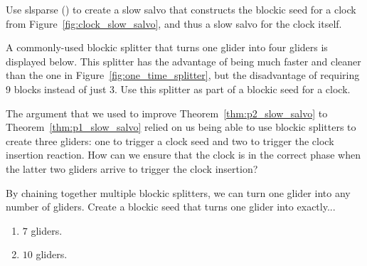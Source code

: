 \begin{multicols}{2}
	
	\mfilbreak
	
	
	\begin{problem}\label{exer:create_clock_turners_nonsync} 
		Use slsparse () to create a slow salvo that constructs the blockic seed for a clock from Figure~\ref{fig:clock_slow_salvo}, and thus a slow salvo for the clock itself.
	\end{problem}
	
	
	\mfilbreak
	
	
	\begin{problem}\label{exer:new_splitter} 
		A commonly-used blockic splitter that turns one glider into four gliders is displayed below. This splitter has the advantage of being much faster and cleaner than the one in Figure~\ref{fig:one_time_splitter}, but the disadvantage of requiring 9 blocks instead of just 3. Use this splitter as part of a blockic seed for a clock.
		\begin{center}
		\end{center}
	\end{problem}
	
	
	\mfilbreak
	
	
	\begin{problemstar}\label{exer:p2_salvo_reduce_to_p1} 
		The argument that we used to improve Theorem~\ref{thm:p2_slow_salvo} to Theorem~\ref{thm:p1_slow_salvo} relied on us being able to use blockic splitters to create three gliders: one to trigger a clock seed and two to trigger the clock insertion reaction. How can we ensure that the clock is in the correct phase when the latter two gliders arrive to trigger the clock insertion?
	\end{problemstar}


	\mfilbreak
	
	
	\begin{problem}\label{exer:blockic_splitter_chain} 
		By chaining together multiple blockic splitters, we can turn one glider into any number of gliders. Create a blockic seed that turns one glider into exactly...
		\begin{enumerate}[label=\bf\color{ocre}(\alph*)]
			\item $7$ gliders.
			
			\item $10$ gliders.
			

\end{enumerate}
\end{problem}
\end{multicols}
